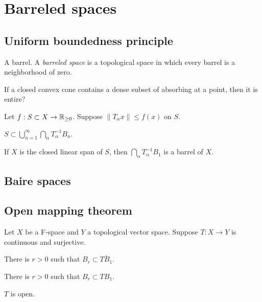 \documentclass{../note}
\begin{document}
\chapter{Barreled spaces}

\section{Uniform boundedness principle}
\begin{prb}
A barrel.
A \emph{barreled space} is a topological space in which every barrel is a neighborhood of zero.
\end{prb}

If a closed convex cone contains a dense subset of absorbing at a point, then it is entire?

\begin{prb}
Let $f:S\subset X\to\mathbb{R}_{\ge0}$.
Suppose $\|T_\alpha x\|\le f(x)$ on $S$.
\begin{parts}
\item $S\subset\bigcup_{n=1}^\infty\bigcap_\alpha T_\alpha^{-1}B_n$.
\item If $X$ is the closed linear span of $S$, then $\bigcap_\alpha T_\alpha^{-1}B_1$ is a barrel of $X$.
\end{parts}
\end{prb}

\section{Baire spaces}

\begin{prb}

\begin{parts}
\end{parts}
\end{prb}

\section{Open mapping theorem}

\begin{prb}
Let $X$ be a F-space and $Y$ a topological vector space.
Suppose $T:X\to Y$ is continuous and surjective.
\begin{parts}
\item There is $r>0$ such that $B_r\subset\bar{TB_1}$.
\item There is $r>0$ such that $B_r\subset TB_1$.
\item $T$ is open.
\end{parts}
\end{prb}
\end{document}
